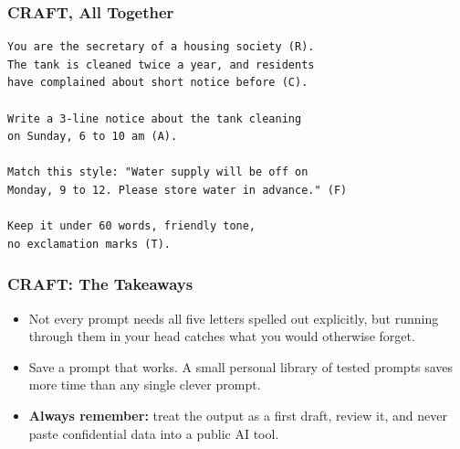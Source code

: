 \begin{frame}[fragile]\frametitle{CRAFT, All Together}

\begin{lstlisting}[language=HTML]
You are the secretary of a housing society (R).
The tank is cleaned twice a year, and residents
have complained about short notice before (C).

Write a 3-line notice about the tank cleaning
on Sunday, 6 to 10 am (A).

Match this style: "Water supply will be off on
Monday, 9 to 12. Please store water in advance." (F)

Keep it under 60 words, friendly tone,
no exclamation marks (T).
\end{lstlisting}

\end{frame}

\begin{frame}[fragile]\frametitle{CRAFT: The Takeaways}

\begin{itemize}
    \item Not every prompt needs all five letters spelled out explicitly, but running through them in your head catches what you would otherwise forget.
    \item Save a prompt that works. A small personal library of tested prompts saves more time than any single clever prompt.
    \item \textbf{Always remember:} treat the output as a first draft, review it, and never paste confidential data into a public AI tool.
\end{itemize}

\end{frame}

